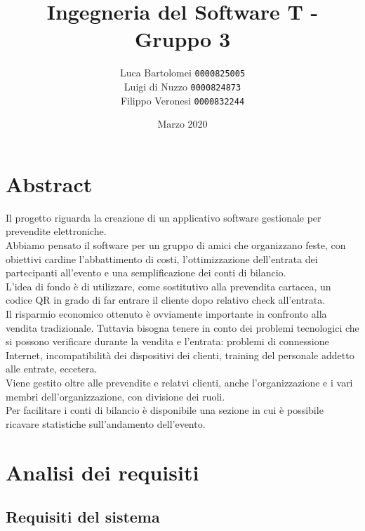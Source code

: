 \documentclass[a4paper]{article}
\title{Ingegneria del Software T - Gruppo 3}
\author{
    Luca Bartolomei 
    \texttt{0000825005}
    \\
    Luigi di Nuzzo
    \texttt{0000824873}
    \\
    Filippo Veronesi
    \texttt{0000832244}
}
\date{Marzo 2020}
\begin{document}
\newcommand{\mc}[2]{\multicolumn{#1}{>{\setlength{\hsize}{#1\hsize}}X|}{#2}}
\newcommand{\mcc}[2]{\multicolumn{#1}{|l|}{#2}}

\maketitle

\tableofcontents

\newpage

\section{Abstract}

Il progetto riguarda la creazione di un applicativo software gestionale per prevendite elettroniche.\\Abbiamo pensato il software per un gruppo di amici che organizzano feste, con obiettivi cardine l'abbattimento di costi, l'ottimizzazione dell'entrata dei partecipanti all'evento e una semplificazione dei conti di bilancio.\\L'idea di fondo è di utilizzare, come sostitutivo alla prevendita cartacea, un codice QR in grado di far entrare il cliente dopo relativo check all'entrata.\\Il risparmio economico ottenuto è ovviamente importante in confronto alla vendita tradizionale. Tuttavia bisogna tenere in conto dei problemi tecnologici che si possono verificare durante la vendita e l'entrata: problemi di connessione Internet, incompatibilità dei dispositivi dei clienti, training del personale addetto alle entrate, eccetera.\\Viene gestito oltre alle prevendite e relatvi clienti, anche l'organizzazione e i vari membri dell'organizzazione, con divisione dei ruoli.\\Per facilitare i conti di bilancio è disponibile una sezione in cui è possibile ricavare statistiche sull'andamento dell'evento.

\newpage

\section{Analisi dei requisiti}

\subsection{Requisiti del sistema}

\end{document}
